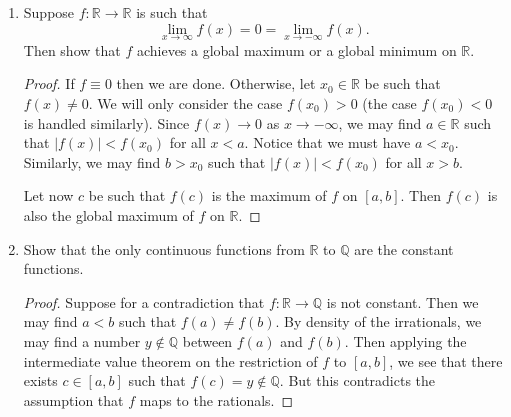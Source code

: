 \documentclass[12pt, reqno]{article}
\numberwithin{equation}{section}
\theoremstyle{definition}
\theoremstyle{remark}
\newcommand{\QQ}{\mathbb{Q}}
\newcommand{\RR}{\mathbb{R}}
\newcommand{\set}[1]{\left\{#1\right\}}
\newcommand{\abs}[1]{\left\lvert#1\right\rvert}
\begin{document}
\begin{enumerate}[leftmargin=*]
	      \begin{proof}
		      Since $f$ is continuous on a closed and bounded interval, there exists $c\in [a,b]$ such that $f(c)$ is the minimum of $\set{f(x) : x\in [a,b]}$. Therefore, picking $\alpha = f(c)$ concludes the proof.
	      \end{proof}

	\item Suppose $f:\RR\to\RR$ is such that
	      \[
		      \lim_{x\to \infty} f(x) = 0 = \lim_{x\to -\infty} f(x).
	      \]
	      Then show that $f$ achieves a global maximum or a global minimum on $\RR$.

	      \begin{proof}
		      If $f \equiv 0$ then we are done. Otherwise, let $x_0 \in \RR$ be such that $f(x) \neq 0$. We will only consider the case $f(x_0) > 0$ (the case $f(x_0) < 0$ is handled similarly). Since $f(x) \to 0$ as $x \to -\infty$, we may find $a \in \RR$ such that $\abs{f(x)} < f(x_0)$ for all $x < a$. Notice that we must have $a<x_0$. Similarly, we may find $b>x_0$ such that $\abs{f(x)} < f(x_0)$ for all $x > b$.

		      Let now $c$ be such that $f(c)$ is the maximum of $f$ on $[a,b]$. Then $f(c)$ is also the global maximum of $f$ on $\RR$.
	      \end{proof}

	\item Show that the only continuous functions from $\RR$ to $\QQ$ are the constant functions.

	      \begin{proof}
		      Suppose for a contradiction that $f:\RR\to\QQ$ is not constant. Then we may find $a < b$ such that $f(a) \neq f(b)$. By density of the irrationals, we may find a number $y \not\in \QQ$ between $f(a)$ and $f(b)$. Then applying the intermediate value theorem on the restriction of $f$ to $[a,b]$, we see that there exists $c\in [a,b]$ such that $f(c) = y \not\in \QQ$. But this contradicts the assumption that $f$ maps to the rationals.
	      \end{proof}

\end{enumerate}
\end{document}
